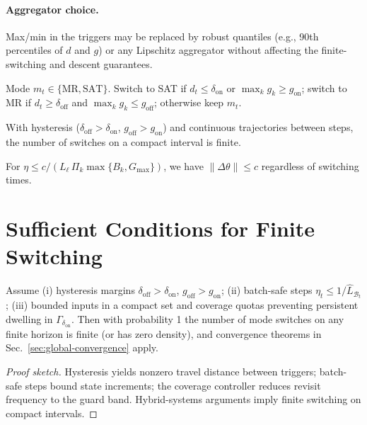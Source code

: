 \documentclass[twoside,11pt]{article}
\begin{document}
\paragraph{Aggregator choice.} Max/min in the triggers may be replaced by robust quantiles (e.g., 90th percentiles of $d$ and $g$) or any Lipschitz aggregator without affecting the finite-switching and descent guarantees.
\begin{definition}
Mode $m_t\in\{\mathrm{MR},\mathrm{SAT}\}$. Switch to SAT if $d_t\le\delta_{\mathrm{on}}$ or $\max_k g_k\ge g_{\mathrm{on}}$; switch to MR if $d_t\ge\delta_{\mathrm{off}}$ and $\max_k g_k\le g_{\mathrm{off}}$; otherwise keep $m_t$.
\end{definition}
\begin{lemma}[No chattering]
With hysteresis ($\delta_{\mathrm{off}}>\delta_{\mathrm{on}}$, $g_{\mathrm{off}}>g_{\mathrm{on}}$) and continuous trajectories between steps, the number of switches on a compact interval is finite.
\end{lemma}
\begin{proposition}
For $\eta\le c/(L_\ell\,\Pi_k\max\{B_k,G_{\max}\})$, we have $\|\Delta\theta\|\le c$ regardless of switching times.
\end{proposition}

\section*{Sufficient Conditions for Finite Switching}
\label{sec:finite-switching}
\begin{theorem}
Assume (i) hysteresis margins $\delta_{\mathrm{off}}>\delta_{\mathrm{on}}$, $g_{\mathrm{off}}>g_{\mathrm{on}}$; (ii) batch-safe steps $\eta_t\le 1/\widehat L_{\mathcal{B}_t}$; (iii) bounded inputs in a compact set and coverage quotas preventing persistent dwelling in $\Gamma_{\delta_{\mathrm{on}}}$. Then with probability 1 the number of mode switches on any finite horizon is finite (or has zero density), and convergence theorems in Sec.~\ref{sec:global-convergence} apply.
\end{theorem}
\begin{proof}[Proof sketch]
Hysteresis yields nonzero travel distance between triggers; batch-safe steps bound state increments; the coverage controller reduces revisit frequency to the guard band. Hybrid-systems arguments imply finite switching on compact intervals.
\end{proof}
\end{document}

